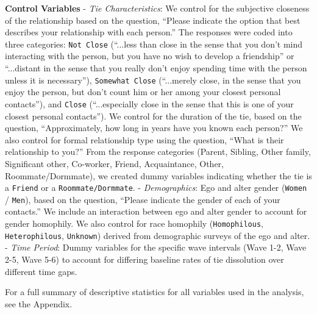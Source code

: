 \textbf{Control Variables} - \emph{Tie Characteristics}: We control for
the subjective closeness of the relationship based on the question, ``Please indicate the option that best describes your relationship with each person.'' The responses were coded into three categories: \texttt{Not\ Close} (``...less than close in the sense that you don't mind interacting with the person, but you have no wish to develop a friendship'' or ``...distant in the sense that you really don’t enjoy spending time with the person unless it is necessary''),
\texttt{Somewhat\ Close} (``...merely close, in the sense that you enjoy the person, but don’t count him or her among your closest personal contacts''), and \texttt{Close} (``...especially close in the sense that this is one of your closest personal contacts''). We control for the duration of the tie, based on the question, ``Approximately, how long in years have you known each person?'' We also control for formal relationship type using the question, ``What is their relationship to you?'' From the response categories (Parent, Sibling, Other family, Significant other, Co-worker, Friend, Acquaintance, Other, Roommate/Dormmate), we created dummy variables indicating whether the tie is a \texttt{Friend} or a \texttt{Roommate/Dormmate}.
- \emph{Demographics}: Ego and alter gender (\texttt{Women} /
\texttt{Men}), based on the question, ``Please indicate the gender of each of your contacts.'' We include an interaction between ego and alter gender to account for gender homophily. We also control for race homophily (\texttt{Homophilous}, \texttt{Heterophilous}, \texttt{Unknown}) derived from demographic surveys of the ego and alter. - \emph{Time Period}: Dummy variables
for the specific wave intervals (Wave 1-2, Wave 2-5, Wave 5-6) to
account for differing baseline rates of tie dissolution over different
time gaps.

For a full summary of descriptive statistics for all variables used in the analysis, see the Appendix.
